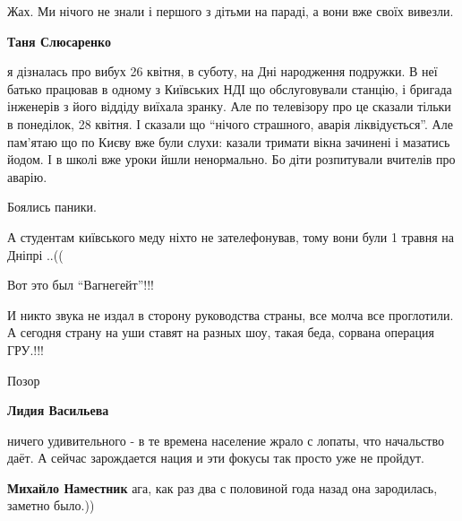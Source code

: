 
 
 
 
 
\zzSecCmt

\begin{itemize} %
Жах. Ми нічого не знали і першого з дітьми на параді, а вони вже своїх вивезли.

\begin{itemize} %
\textbf{Таня Слюсаренко} 

я дізналась про вибух 26 квітня, в суботу, на Дні народження подружки. В неї
батько працював в одному з Київських НДІ що обслуговували станцію, і бригада
інженерів з його віддіду виїхала зранку. Але по телевізору про це сказали
тільки в понеділок, 28 квітня. І сказали що \enquote{нічого страшного, аварія
ліквідується}. Але пам'ятаю що по Києву вже були слухи: казали тримати вікна
зачинені і мазатись йодом. І в школі вже уроки йшли ненормально. Бо діти
розпитували вчителів про аварію.

Боялись паники.
\end{itemize} %

А студентам київського меду ніхто не зателефонував, тому вони були 1 травня на Дніпрі ..((

Вот это был
\enquote{Вагнегейт}!!!

И никто звука не издал в сторону руководства страны, все молча все проглотили. А
сегодня страну на уши ставят на разных шоу, такая беда, сорвана операция
ГРУ.!!!

Позор

\begin{itemize} %
\textbf{Лидия Васильева} 

ничего удивительного - в те времена население жрало с лопаты, что начальство
даёт. А сейчас зарождается нация и эти фокусы так просто уже не пройдут.

\begin{itemize} %
\textbf{Михайло Наместник} ага, как раз два с половиной года назад она зародилась, заметно было.))


\end{itemize}
\end{itemize}
\end{itemize}
